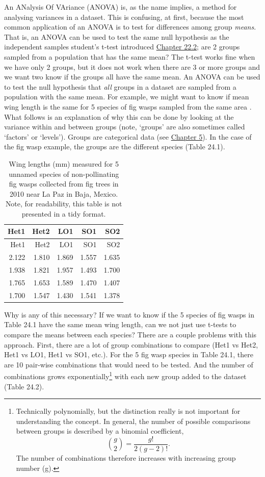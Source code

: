 \documentclass[
]{scrbook}
\begin{document}
An ANalysis Of VAriance (ANOVA) is, as the name implies, a method for analysing variances in a dataset.
This is confusing, at first, because the most common application of an ANOVA is to test for differences among group \emph{means}.
That is, an ANOVA can be used to test the same null hypothesis as the independent samples student's t-test introduced \protect\hyperlink{independent-samples-t-test}{Chapter 22.2}; are 2 groups sampled from a population that has the same mean?
The t-test works fine when we have only 2 groups, but it does not work when there are 3 or more groups and we want two know if the groups all have the same mean.
An ANOVA can be used to test the null hypothesis that \emph{all} groups in a dataset are sampled from a population with the same mean.
For example, we might want to know if mean wing length is the same for 5 species of fig wasps sampled from the same area \citep{Duthie2015b}.
What follows is an explanation of why this can be done by looking at the variance within and between groups (note, `groups' are also sometimes called `factors' or `levels').
Groups are categorical data (see \protect\hyperlink{Chapter_5}{Chapter 5}).
In the case of the fig wasp example, the groups are the different species (Table 24.1).

\begin{longtable}[]{@{}rrrrr@{}}
\caption{\label{tab:unnamed-chunk-107}Wing lengths (mm) measured for 5 unnamed species of non-pollinating fig wasps collected from fig trees in 2010 near La Paz in Baja, Mexico. Note, for readability, this table is not presented in a tidy format.}\tabularnewline
\toprule
Het1 & Het2 & LO1 & SO1 & SO2 \\
\midrule
\endfirsthead
\toprule
Het1 & Het2 & LO1 & SO1 & SO2 \\
\midrule
\endhead
2.122 & 1.810 & 1.869 & 1.557 & 1.635 \\
1.938 & 1.821 & 1.957 & 1.493 & 1.700 \\
1.765 & 1.653 & 1.589 & 1.470 & 1.407 \\
1.700 & 1.547 & 1.430 & 1.541 & 1.378 \\
\bottomrule
\end{longtable}

Why is any of this necessary?
If we want to know if the 5 species of fig wasps in Table 24.1 have the same mean wing length, can we not just use t-tests to compare the means between each species?
There are a couple problems with this approach.
First, there are a lot of group combinations to compare (Het1 vs Het2, Het1 vs LO1, Het1 vs SO1, etc.).
For the 5 fig wasp species in Table 24.1, there are 10 pair-wise combinations that would need to be tested.
And the number of combinations grows exponentially\footnote{Technically polynomially, but the distinction really is not important for understanding the concept. In general, the number of possible comparisons between groups is described by a binomial coefficient, \[\binom{g}{2} = \frac{g!}{2\left(g - 2 \right)!}.\] The number of combinations therefore increases with increasing group number (g).} with each new group added to the dataset (Table 24.2).
\end{document}
